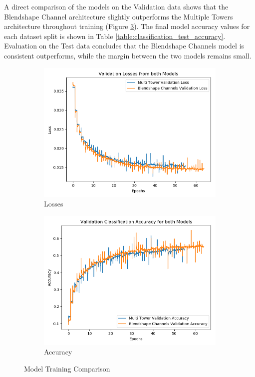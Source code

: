 A direct comparison of the models on the Validation data shows that the Blendshape Channel architecture slightly outperforms the Multiple Towers architecture throughout training (Figure \ref{fig:classification_training}).
The final model accuracy values for each dataset split is shown in Table \ref{table:classification_test_accuracy}.
Evaluation on the Test data concludes that the Blendshape Channels model is consistent outperforms, while the margin between the two models remains small.

\begin{figure}[h!]
    \centering
    \begin{subfigure}[b]{0.49\textwidth}
        \includegraphics[width=\textwidth]{figures/classification/both_models_val_loss.png}
        \caption{Losses}\label{fig:both_models_val_loss}
    \end{subfigure}
    \begin{subfigure}[b]{0.49\textwidth}
        \includegraphics[width=\textwidth]{figures/classification/both_models_val_acc.png}
        \caption{Accuracy}\label{fig:both_models_val_acc}
    \end{subfigure}
    \caption{Model Training Comparison}\label{fig:classification_training}
\end{figure}

